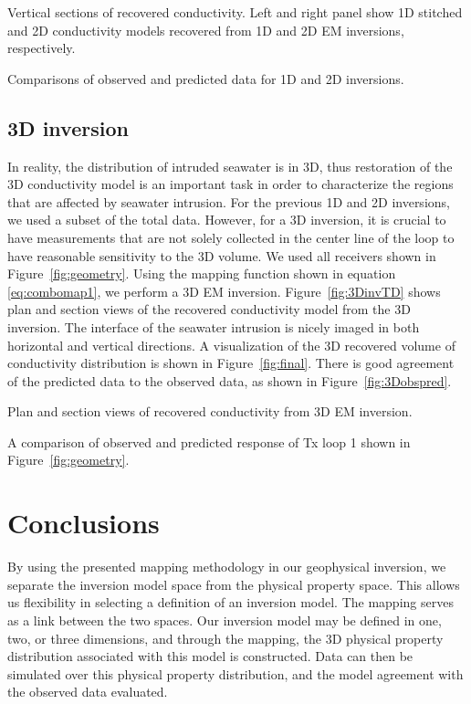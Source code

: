 \documentclass{segabs}
\begin{document}
{Vertical sections of recovered conductivity. Left and right panel show 1D stitched and 2D conductivity models recovered from 1D and 2D EM inversions, respectively.}

{Comparisons of observed and predicted data for 1D and 2D inversions. }

\subsection*{3D inversion}
In reality, the distribution of intruded seawater is in 3D, thus restoration of the 3D conductivity model is an important task in order to characterize the regions that are affected by seawater intrusion. For the previous 1D and 2D inversions, we used a subset of the total data. However, for a 3D inversion, it is crucial to have measurements that are not solely collected in the center line of the loop to have reasonable sensitivity to the 3D volume. We used all receivers shown in Figure~\ref{fig:geometry}. Using the mapping function shown in equation \ref{eq:combomap1}, we perform a 3D EM inversion. Figure~\ref{fig:3DinvTD} shows plan and section views of the recovered conductivity model from the 3D inversion. The interface of the seawater intrusion is nicely imaged in both horizontal and vertical directions. A visualization of the 3D recovered volume of conductivity distribution is shown in Figure~\ref{fig:final}. There is good agreement of the predicted data to the observed data, as shown in Figure~\ref{fig:3Dobspred}.

{Plan and section views of recovered conductivity from 3D EM inversion.}

{A comparison of observed and predicted response of Tx loop 1 shown in Figure~\ref{fig:geometry}.}

\section*{Conclusions}
By using the presented mapping methodology in our geophysical inversion, we separate the inversion model space from the physical property space. This allows us flexibility in selecting a definition of an inversion model. The mapping serves as a link between the two spaces. Our inversion model may be defined in one, two, or three dimensions, and through the mapping, the 3D physical property distribution associated with this model is constructed. Data can then be simulated over this physical property distribution, and the model agreement with the observed data evaluated.
\end{document}

